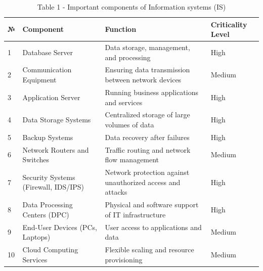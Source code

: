 \begin{table}[H]
\caption*{Table 1 - Important components of Information systems (IS)}
\centering
\begin{tabular}{|l|l|p{}|l|}
\hline
№ & Component & Function & Criticality Level \\ \hline
1 & Database Server & Data storage, management, and processing & High \\ \hline
2 & Communication Equipment & Ensuring data transmission between network devices & Medium \\ \hline
3 & Application Server & Running business applications and services & High \\ \hline
4 & Data Storage Systems & Centralized storage of large volumes of data & High \\ \hline
5 & Backup Systems & Data recovery after failures & High \\ \hline
6 & Network Routers and Switches & Traffic routing and network flow management & Medium \\ \hline
7 & Security Systems (Firewall, IDS/IPS) & Network protection against unauthorized access and attacks & High \\ \hline
8 & Data Processing Centers (DPC) & Physical and software support of IT infrastructure & High \\ \hline
9 & End-User Devices (PCs, Laptops) & User access to applications and data & Medium \\ \hline
10 & Cloud Computing Services & Flexible scaling and resource provisioning & Medium \\ \hline
\end{tabular}
\end{table}

